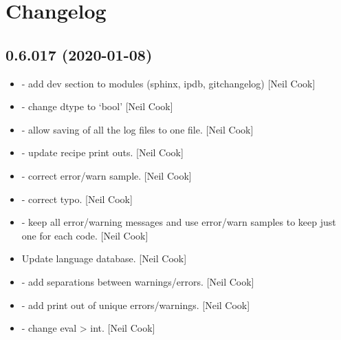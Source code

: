 \documentclass[a4paper,10pt,english]{report}
\begin{document}
\section{Changelog}
\label{\detokenize{misc/changelog:changelog}}\label{\detokenize{misc/changelog::doc}}

\subsection{0.6.017 (2020-01-08)}
\label{\detokenize{misc/changelog:id1}}\begin{itemize}
\item {} 
 - add dev section to modules (sphinx, ipdb,
gitchangelog) {[}Neil Cook{]}

\item {} 
 - change dtype to
‘bool’ {[}Neil Cook{]}

\item {} 
 - allow saving of all the log
files to one file. {[}Neil Cook{]}

\item {} 
 - update recipe print outs.
{[}Neil Cook{]}

\item {} 
 - correct error/warn sample.
{[}Neil Cook{]}

\item {} 
 - correct typo. {[}Neil Cook{]}

\item {} 
 - keep all error/warning
messages and use error/warn samples to keep just one for each code.
{[}Neil Cook{]}

\item {} 
Update language database. {[}Neil Cook{]}

\item {} 
 - add separations between
warnings/errors. {[}Neil Cook{]}

\item {} 
 - add print out of unique
errors/warnings. {[}Neil Cook{]}

\item {} 
 - change eval \textendash{}\textgreater{} int. {[}Neil
Cook{]}


\end{itemize}
\end{document}
